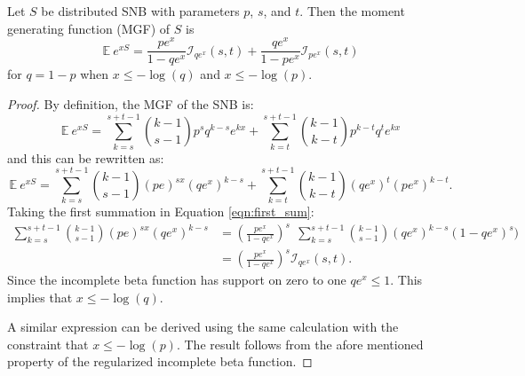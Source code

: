 \documentclass[12pt]{article}         %
\begin{document}
\begin{prop} Let $S$ be distributed SNB with parameters $p$, $s$, and $t$.
Then the moment generating function (MGF) of $S$ is
\begin{equation} \label{eqn:mgf}
\mathbb{E}~e^{xS} = \frac{p e^x}{1 - qe^x} \mathcal{I}_{qe^x} (s, t) + 
  \frac{qe^x}{1-pe^x} \mathcal{I}_{pe^x}(s, t)
\end{equation}
for $q = 1-p$ when $x \leq -\log(q)$ and $x \leq -\log(p)$.
\end{prop}
\begin{proof}
By definition, the MGF of the SNB is:
\begin{equation*}
\mathbb{E}~e^{xS} = \sum_{k=s}^{s+t-1} {k-1 \choose s-1} p^s q^{k-s} e^{kx} 
  + \sum_{k=t}^{s+t-1} {k-1 \choose k-t} p^{k-t} q^t e^{kx}
\end{equation*}
and this can be rewritten as:
\begin{equation} \label{eqn:first_sum}
\mathbb{E}~e^{xS} = \sum_{k=s}^{s+t-1}{k-1 \choose s-1} (pe)^{sx} (qe^x)^{k-s} 
  + \sum_{k=t}^{s+t-1}{k-1 \choose k-t} (qe^x)^t (pe^x)^{k-t}.
\end{equation}
Taking the first summation in Equation \ref{eqn:first_sum}:
\begin{align*}
\sum_{k=s}^{s+t-1}{k-1 \choose s-1} (pe)^{sx} (qe^x)^{k-s} &= 
  \left(\frac{pe^x}{1 - qe^x}\right)^s \ \ \sum_{k=s}^{s+t-1} {k-1 \choose s-1} 
    (qe^x)^{k-s} (1-qe^x)^s) \\
  &= \left(\frac{pe^x}{1 - qe^x}\right)^s \mathcal{I}_{qe^x}(s, t).
\end{align*}
Since the incomplete beta function has support on zero to one 
$qe^x \leq 1$. This implies that $x \leq -\log(q)$.

A similar expression can be derived using the same calculation with 
the constraint that $x \leq -\log(p)$. The result
follows from the afore mentioned property of the regularized incomplete
beta function.
\end{proof}
\end{document}
